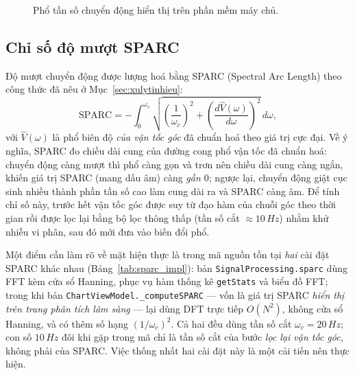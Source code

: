 \documentclass[../DoAn.tex]{subfiles}
\begin{document}
\begin{figure}[H]
    \centering
    \caption{Phổ tần số chuyển động hiển thị trên phần mềm máy chủ.}
    \label{fig:fft_spectrum}
\end{figure}

\subsection{Chỉ số độ mượt SPARC}
Độ mượt chuyển động được lượng hoá bằng SPARC (Spectral Arc Length) theo công thức đã nêu ở Mục~\ref{sec:xulytinhieu}:
\begin{equation}
    \mathrm{SPARC} = -\int_{0}^{\omega_c}\sqrt{\left(\frac{1}{\omega_c}\right)^2 + \left(\frac{d\hat{V}(\omega)}{d\omega}\right)^2}\,d\omega,
    \label{eq:sparc_impl}
\end{equation}
với $\hat{V}(\omega)$ là phổ biên độ \emph{của vận tốc góc} đã chuẩn hoá theo giá trị cực đại. Về ý nghĩa, SPARC đo chiều dài cung của đường cong phổ vận tốc đã chuẩn hoá: chuyển động càng mượt thì phổ càng gọn và trơn nên chiều dài cung càng ngắn, khiến giá trị SPARC (mang dấu âm) càng \emph{gần $0$}; ngược lại, chuyển động giật cục sinh nhiều thành phần tần số cao làm cung dài ra và SPARC càng âm. Để tính chỉ số này, trước hết vận tốc góc được suy từ đạo hàm của chuỗi góc theo thời gian rồi được lọc lại bằng bộ lọc thông thấp (tần số cắt $\approx 10\,\si{Hz}$) nhằm khử nhiễu vi phân, sau đó mới đưa vào biến đổi phổ.

Một điểm cần làm rõ về mặt hiện thực là trong mã nguồn tồn tại \emph{hai} cài đặt SPARC khác nhau (Bảng~\ref{tab:sparc_impl}): bản \texttt{SignalProcessing.sparc} dùng FFT kèm cửa sổ Hanning, phục vụ hàm thống kê \texttt{getStats} và biểu đồ FFT; trong khi bản \texttt{ChartViewModel.\_computeSPARC} --- vốn là giá trị SPARC \emph{hiển thị trên trang phân tích lâm sàng} --- lại dùng DFT trực tiếp $O(N^2)$, không cửa sổ Hanning, và có thêm số hạng $(1/\omega_c)^2$. Cả hai đều dùng tần số cắt $\omega_c = 20\,\si{Hz}$; con số $10\,\si{Hz}$ đôi khi gặp trong mã chỉ là tần số cắt của bước \emph{lọc lại vận tốc góc}, không phải của SPARC. Việc thống nhất hai cài đặt này là một cải tiến nên thực hiện.
\end{document}

